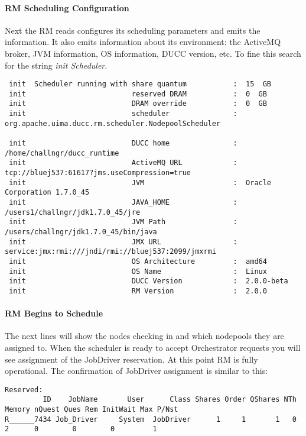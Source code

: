    \paragraph{RM Scheduling Configuration}
   Next the RM reads configures its scheduling parameters and emits the information.  It also emits information
   about its environment: the ActiveMQ broker, JVM information, OS information, DUCC version, etc.  To fine
   this search for the string {\em init  Scheduler}.
\begin{verbatim}
 init  Scheduler running with share quantum           :  15  GB
 init                         reserved DRAM           :  0  GB
 init                         DRAM override           :  0  GB
 init                         scheduler               :  org.apache.uima.ducc.rm.scheduler.NodepoolScheduler

 init                         DUCC home               :  /home/challngr/ducc_runtime
 init                         ActiveMQ URL            :  tcp://bluej537:61617?jms.useCompression=true
 init                         JVM                     :  Oracle Corporation 1.7.0_45
 init                         JAVA_HOME               :  /users1/challngr/jdk1.7.0_45/jre
 init                         JVM Path                :  /users/challngr/jdk1.7.0_45/bin/java
 init                         JMX URL                 :  service:jmx:rmi:///jndi/rmi://bluej537:2099/jmxrmi
 init                         OS Architecture         :  amd64
 init                         OS Name                 :  Linux
 init                         DUCC Version            :  2.0.0-beta
 init                         RM Version              :  2.0.0
\end{verbatim}

   \paragraph{RM Begins to Schedule}
   The next lines will show the nodes checking in and which nodepools they are assigned to.  When the scheduler is
   ready to accept Orchestrator requests you will see assignment of the JobDriver reservation.  At this point
   RM is fully operational.  The confirmation of JobDriver assignment is similar to this:
\begin{verbatim}
Reserved:
         ID    JobName       User      Class Shares Order QShares NTh Memory nQuest Ques Rem InitWait Max P/Nst
R______7434 Job_Driver     System  JobDriver      1     1       1   0      2      0        0        0         1
\end{verbatim}

